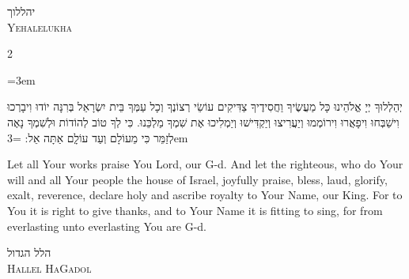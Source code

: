 \documentclass[11pt, openany]{book}
\newcommand{\sederdivider}{%
  \par\vspace{6pt}
  \begin{center}
    \textcolor{sedergold}{\pgfornament[width=1.5cm]{11}}
  \end{center}
  \par\vspace{6pt}
}
\newenvironment{bilingual}{%
  \par\vspace{4pt}%
  \begin{paracol}{2}%
}{%
  \end{paracol}%
  \par\vspace{2pt}%
}
\newenvironment{hebrewcol}{%
  \switchcolumn[1]%
  \begingroup
  \RTL
  \hebrewfont\large
  \setstretch{1.4}%
  \emergencystretch=3em
  \tolerance=9999
  \parindent=0pt\relax
}{%
  \endRTL
  \endgroup
}
\newenvironment{englishcol}{%
  \switchcolumn[0]%
  \begingroup
  \setstretch{1.4}%
  \emergencystretch=3em
  \tolerance=9999
  \normalsize
  \rightskip=0.12in\relax
}{%
  \endgroup
}
\newcommand{\subsedertitle}[2]{%
  \par\vspace{8pt}
  \begin{center}
    {\hebrewfontsanslarge\textcolor{sederblue}{\beginR #1\endR}}\\[3pt]
    {\normalsize\scshape\textcolor{sederblue}{#2}}
  \end{center}
  \par\vspace{3pt}
}
\begin{document}
\subsedertitle{יהללוך}{Yehalelukha}

\begin{bilingual}
\begin{hebrewcol}
יְהַלְלוּךָ יְיָ אֱלֹהֵינוּ כָּל מַעֲשֶׂיךָ וַחֲסִידֶיךָ צַדִּיקִים עוֹשֵׂי רְצוֹנֶךָ וְכָל עַמְּךָ בֵּית יִשְׂרָאֵל בְּרִנָּה יוֹדוּ וִיבָרְכוּ וִישַׁבְּחוּ וִיפָאֲרוּ וִירוֹמְמוּ וְיַעֲרִיצוּ וְיַקְדִּישׁוּ וְיַמְלִיכוּ אֶת שִׁמְךָ מַלְכֵּנוּ. כִּי לְךָ טוֹב לְהוֹדוֹת וּלְשִׁמְךָ נָאֶה לְזַמֵּר כִּי מֵעוֹלָם וְעַד עוֹלְָם אַתָּה אֵל:
\end{hebrewcol}
\begin{englishcol}
Let all Your works praise You Lord, our G-d. And let the righteous, who do Your will and all Your people the house of Israel, joyfully praise, bless, laud, glorify, exalt, reverence, declare holy and ascribe royalty to Your Name, our King. For to You it is right to give thanks, and to Your Name it is fitting to sing, for from everlasting unto everlasting You are G-d.
\end{englishcol}
\end{bilingual}
\sederdivider

\subsedertitle{הלל הגדול}{Hallel HaGadol}
\end{document}
